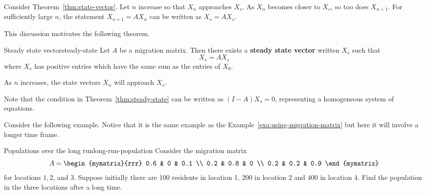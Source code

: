 Consider Theorem~\ref{thm:state-vector}. Let $n$ increase so that $X_n$ approaches $X_s$. As $X_n$ becomes closer to $X_s$, so too does $X_{n+1}$. For sufficiently large $n$, the statement $X_{n+1} = AX_n$ can be written as $X_s = AX_s$. 

This discussion motivates the following theorem.

\begin{theorem}{Steady state vector}{steady-state}
Let $A$ be a migration matrix. Then there exists a \textbf{steady state vector} written $X_s$ such that 
\[
X_s = AX_s
\]
where $X_s$ has positive entries which have the same sum as the entries of $X_0$. 

As $n$ increases, the state vectors $X_n$ will approach $X_s$. 
\end{theorem}

Note that the condition in Theorem~\ref{thm:steady-state} can be written as $(I - A)X_s=0$, representing a homogeneous system of equations. 

Consider the following example. Notice that it is the same example as the Example~\ref{exa:using-migration-matrix} but here it will
involve a longer time frame.

\begin{example}{Populations over the long run}{long-run-population}
Consider the migration matrix 
\begin{equation*}
A
=
\begin{mymatrix}{rrr}
0.6 & 0 & 0.1 \\
0.2 & 0.8 & 0 \\
0.2 & 0.2 & 0.9
\end{mymatrix} 
\end{equation*}
 for locations $1,2$, and $3$. Suppose initially there are 100
residents in location 1, 200 in location 2 and 400 in location 4. Find the
population in the three locations after a long time.
\end{example}

